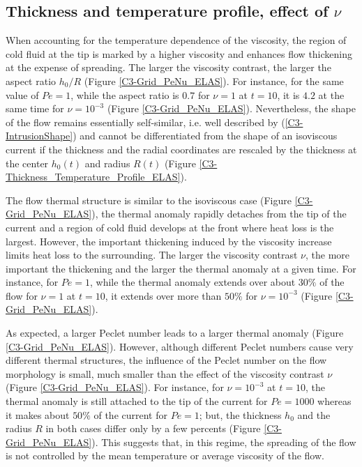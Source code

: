 \subsection{Thickness and temperature profile, effect of $\nu$}
\label{C3-sec:thickn-temp-prof-1-e}

When accounting for  the temperature dependence of  the viscosity, the
region of cold  fluid at the tip  is marked by a  higher viscosity and
enhances flow thickening at the  expense of spreading.  The larger the
viscosity  contrast,  the  larger  the aspect  ratio  $h_0/R$  (Figure
\ref{C3-Grid_PeNu_ELAS}).  For instance, for the same value of $Pe=1$,
while the aspect ratio is $0.7$ for  $\nu=1$ at $t=10$, it is $4.2$ at
the  same  time  for $\nu=10^{-3}$  (Figure  \ref{C3-Grid_PeNu_ELAS}).
Nevertheless, the shape of  the flow remains essentially self-similar,
i.e.  well  described  by   (\ref{C3-IntrusionShape})  and  cannot  be
differentiated  from  the  shape  of  an  isoviscous  current  if  the
thickness and the radial coordinates  are rescaled by the thickness at
the     center     $h_0(t)$      and     radius     $R(t)$     (Figure
\ref{C3-Thickness_Temperature_Profile_ELAS}).

The flow thermal  structure is similar to the  isoviscous case (Figure
\ref{C3-Grid_PeNu_ELAS}),  the thermal  anomaly rapidly  detaches from
the tip  of the  current and a  region of cold  fluid develops  at the
front  where  heat  loss  is  the  largest.   However,  the  important
thickening induced by  the viscosity increase limits heat  loss to the
surrounding.   The  larger  the  viscosity contrast  $\nu$,  the  more
important the thickening and the larger the thermal anomaly at a given
time.  For  instance, for  $Pe=1$, while  the thermal  anomaly extends
over about $30\%$  of the flow for $\nu=1$ at  $t=10$, it extends over
more than $50\%$ for $\nu=10^{-3}$ (Figure \ref{C3-Grid_PeNu_ELAS}).

As expected, a larger Peclet number  leads to a larger thermal anomaly
(Figure \ref{C3-Grid_PeNu_ELAS}).  However,  although different Peclet
numbers cause very different thermal  structures, the influence of the
Peclet number on  the flow morphology is small, much  smaller than the
effect     of     the     viscosity     contrast     $\nu$     (Figure
\ref{C3-Grid_PeNu_ELAS}).  For instance,  for $\nu=10^{-3}$ at $t=10$,
the thermal  anomaly is still attached  to the tip of  the current for
$Pe = 1000$  whereas it makes about $50\%$ of  the current for $Pe=1$;
but, the thickness $h_0$ and the  radius $R$ in both cases differ only
by  a few  percents (Figure  \ref{C3-Grid_PeNu_ELAS}).  This  suggests
that, in this  regime, the spreading of the flow  is not controlled by
the mean temperature or average viscosity of the flow.
  
